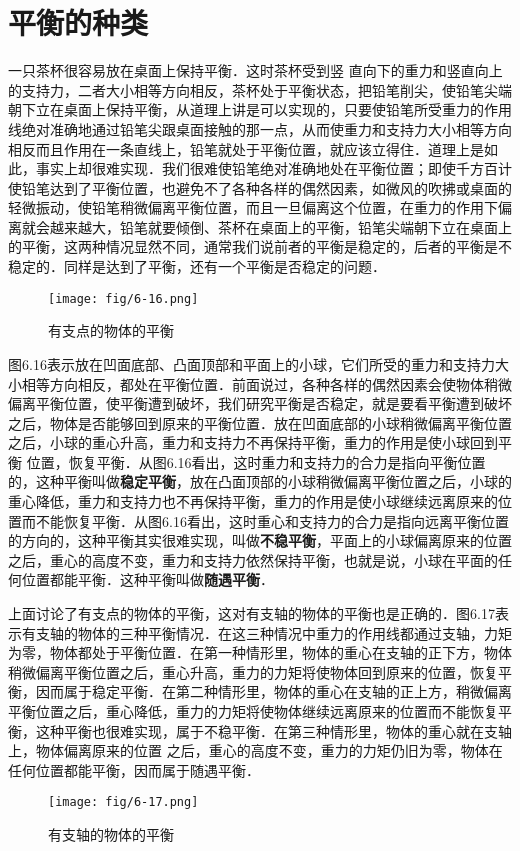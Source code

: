 \section{平衡的种类}
一只茶杯很容易放在桌面上保持平衡．这时茶杯受到竖
直向下的重力和竖直向上的支持力，二者大小相等方向相反，茶杯处于平衡状态，把铅笔削尖，使铅笔尖端朝下立在桌面上保持平衡，从道理上讲是可以实现的，只要使铅笔所受重力的作用线绝对准确地通过铅笔尖跟桌面接触的那一点，从而使重力和支持力大小相等方向相反而且作用在一条直线上，铅笔就处于平衡位置，就应该立得住．道理上是如此，事实上却很难实现．我们很难使铅笔绝对准确地处在平衡位置；即使千方百计使铅笔达到了平衡位置，也避免不了各种各样的偶然因素，如微风的吹拂或桌面的轻微振动，使铅笔稍微偏离平衡位置，而且一旦偏离这个位置，在重力的作用下偏离就会越来越大，铅笔就要倾倒、茶杯在桌面上的平衡，铅笔尖端朝下立在桌面上的平衡，这两种情况显然不同，通常我们说前者的平衡是稳定的，后者的平衡是不稳定的．同样是达到了平衡，还有一个平衡是否稳定的问题．
\begin{figure}[htp]
\centering\texttt{[image: fig/6-16.png]}
\caption{有支点的物体的平衡}
\end{figure}

图6.16表示放在凹面底部、凸面顶部和平面上的小球，它们所受的重力和支持力大小相等方向相反，都处在平衡位置．前面说过，各种各样的偶然因素会使物体稍微偏离平衡位置，使平衡遭到破坏，我们研究平衡是否稳定，就是要看平衡遭到破坏之后，物体是否能够回到原来的平衡位置．放在凹面底部的小球稍微偏离平衡位置之后，小球的重心升高，重力和支持力不再保持平衡，重力的作用是使小球回到平衡
位置，恢复平衡．从图6.16看出，这时重力和支持力的合力是指向平衡位置的，这种平衡叫做\textbf{稳定平衡}，放在凸面顶部的小球稍微偏离平衡位置之后，小球的重心降低，重力和支持力也不再保持平衡，重力的作用是使小球继续远离原来的位置而不能恢复平衡．从图6.16看出，这时重心和支持力的合力是指向远离平衡位置的方向的，这种平衡其实很难实现，叫做\textbf{不稳平衡}，平面上的小球偏离原来的位置之后，重心的高度不变，重力和支持力依然保持平衡，也就是说，小球在平面的任何位置都能平衡．这种平衡叫做\textbf{随遇平衡}．

上面讨论了有支点的物体的平衡，这对有支轴的物体的平衡也是正确的．图6.17表示有支轴的物体的三种平衡情况．在这三种情况中重力的作用线都通过支轴，力矩为零，物体都处于平衡位置．在第一种情形里，物体的重心在支轴的正下方，物体稍微偏离平衡位置之后，重心升高，重力的力矩将使物体回到原来的位置，恢复平衡，因而属于稳定平衡．在第二种情形里，物体的重心在支轴的正上方，稍微偏离平衡位置之后，重心降低，重力的力矩将使物体继续远离原来的位置而不能恢复平衡，这种平衡也很难实现，属于不稳平衡．在第三种情形里，物体的重心就在支轴上，物体偏离原来的位置
之后，重心的高度不变，重力的力矩仍旧为零，物体在任何位置都能平衡，因而属于随遇平衡．
\begin{figure}[htp]
\centering\texttt{[image: fig/6-17.png]}
\caption{有支轴的物体的平衡}
\end{figure}

